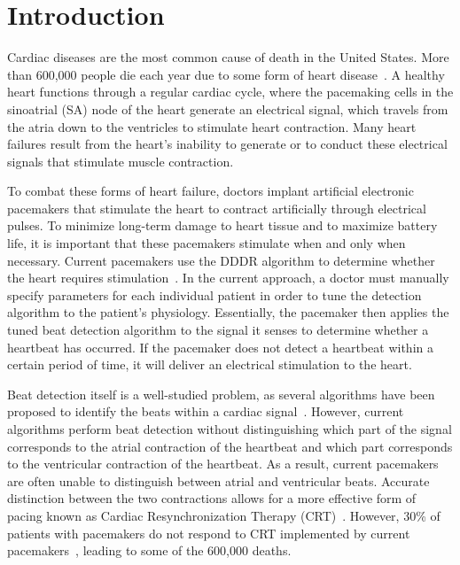\documentclass[conference]{IEEEtran}
\begin{document}




%
\IEEEpeerreviewmaketitle



\section{Introduction}
Cardiac diseases are the most common cause of death in
the United States. More than 600,000 people die each year
due to some form of heart disease~\cite{death-stats}. A healthy heart
functions through a regular cardiac cycle, where the pacemaking cells
in the sinoatrial (SA) node of the heart
generate an electrical signal, which travels from the atria
down to the ventricles to stimulate heart contraction.
Many heart failures result from the heart's inability to
generate or to conduct these electrical signals
that stimulate muscle contraction. 

To combat these forms of heart failure, doctors implant artificial electronic pacemakers
that stimulate the heart
to contract artificially through 
electrical pulses.
To minimize long-term damage to heart tissue and to maximize battery life, it is important that these pacemakers stimulate when and only when necessary.
Current pacemakers use the 
DDDR algorithm to determine whether
the heart requires stimulation~\cite{basic-pacing}.
In the current approach, a doctor must manually specify parameters for each individual patient in order to tune the detection algorithm to the patient's physiology.
Essentially, the pacemaker then applies the tuned beat detection algorithm to the signal it senses
to determine whether a
heartbeat has occurred. If the pacemaker does not detect a heartbeat
within a certain period of time, it will deliver an
electrical stimulation to the heart.

Beat detection itself is a well-studied problem, as
several algorithms have been proposed to identify the
beats within a cardiac signal~\cite{realtime-qrs, ecg-filter, patient-adaptable}. However, current
algorithms perform beat detection without distinguishing
which part of the signal corresponds to the atrial
contraction of the heartbeat and which part corresponds to 
the ventricular contraction of the heartbeat. As a result,
current pacemakers are often unable to distinguish
between atrial and ventricular beats.
Accurate distinction between the two contractions allows for a more effective form of pacing known as
Cardiac Resynchronization Therapy (CRT)~\cite{multisite-crt}.
However,  30\% of patients with pacemakers do 
not respond to CRT implemented by current pacemakers~\cite{multisite-crt}, leading to some of the 600,000 deaths. 
\end{document}
